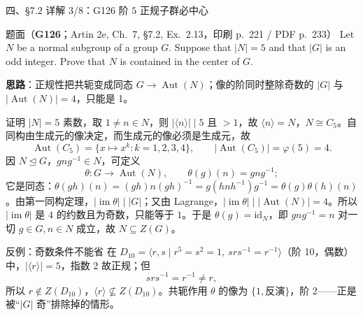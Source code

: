 \documentclass[aspectratio=169,10pt,fontset=none]{ctexbeamer}
\newcommand{\ex}[1]{\textcolor{accent}{\footnotesize\bfseries #1}}
\newcommand{\key}[1]{\textcolor{ink}{\bfseries #1}}
\begin{document}
\begin{frame}[t]{四、\S7.2 详解 3/8：G126 阶 $5$ 正规子群必中心}
\label{ex:G126}
\scriptsize
\begin{block}{\footnotesize 题面（\ex{G126}；Artin 2e, Ch.~7, \S7.2, Ex.~2.13，印刷 p.~221 / PDF p.~233）}
Let $N$ be a normal subgroup of a group $G$. Suppose that $|N|=5$ and that $|G|$ is an odd integer. Prove that $N$ is contained in the center of $G$.
\end{block}
\key{思路}：正规性把共轭变成同态 $G\to\operatorname{Aut}(N)$；像的阶同时整除奇数的 $|G|$ 与 $|\operatorname{Aut}(N)|=4$，只能是 1。
\begin{block}{\footnotesize 证明}
$|N|=5$ 素数，取 $1\ne n\in N$，则 $|\langle n\rangle|\mid5$ 且 $>1$，故 $\langle n\rangle=N$，$N\cong C_5$。自同构由生成元的像决定，而生成元的像必须是生成元，故
\[
\operatorname{Aut}(C_5)=\{x\mapsto x^k:k=1,2,3,4\},\qquad |\operatorname{Aut}(C_5)|=\varphi(5)=4.
\]
因 $N\trianglelefteq G$，$gng^{-1}\in N$，可定义
\[
\theta:G\longrightarrow\operatorname{Aut}(N),\qquad \theta(g)(n)=gng^{-1};
\]
它是同态：$\theta(gh)(n)=(gh)n(gh)^{-1}=g(hnh^{-1})g^{-1}=\theta(g)\theta(h)(n)$。由第一同构定理，$|\operatorname{im}\theta|\mid|G|$；又由 Lagrange，$|\operatorname{im}\theta|\mid|\operatorname{Aut}(N)|=4$。所以 $|\operatorname{im}\theta|$ 是 $4$ 的约数且为奇数，只能等于 $1$。于是 $\theta(g)=\mathrm{id}_N$，即 $gng^{-1}=n$ 对一切 $g\in G,n\in N$ 成立，故 $N\subseteq Z(G)$。
\end{block}
\begin{block}{\footnotesize 反例：奇数条件不能省}
在 $D_{10}=\langle r,s\mid r^5=s^2=1,\ srs^{-1}=r^{-1}\rangle$（阶 10，偶数）中，$|\langle r\rangle|=5$，指数 2 故正规；但
\[
srs^{-1}=r^{-1}\ne r,
\]
所以 $r\notin Z(D_{10})$，$\langle r\rangle\not\subseteq Z(D_{10})$。共轭作用 $\theta$ 的像为 $\{1,\text{反演}\}$，阶 2——正是被“$|G|$ 奇”排除掉的情形。
\end{block}
\end{frame}
\end{document}
